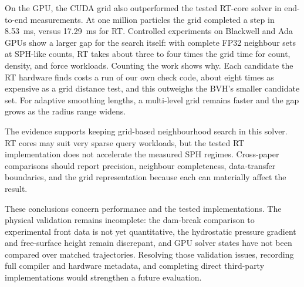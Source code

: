 \documentclass[conference]{IEEEtran}
\begin{document}
On the GPU, the CUDA grid also outperformed the tested RT-core solver in end-to-end measurements. At one million particles the grid completed a step in 8.53~ms, versus 17.29~ms for RT. Controlled experiments on Blackwell and Ada GPUs show a larger gap for the search itself: with complete FP32 neighbour sets at SPH-like counts, RT takes about three to four times the grid time for count, density, and force workloads. Counting the work shows why. Each candidate the RT hardware finds costs a run of our own check code, about eight times as expensive as a grid distance test, and this outweighs the BVH's smaller candidate set. For adaptive smoothing lengths, a multi-level grid remains faster and the gap grows as the radius range widens.

The evidence supports keeping grid-based neighbourhood search in this solver. RT cores may suit very sparse query workloads, but the tested RT implementation does not accelerate the measured SPH regimes. Cross-paper comparisons should report precision, neighbour completeness, data-transfer boundaries, and the grid representation because each can materially affect the result.

These conclusions concern performance and the tested implementations. The physical validation remains incomplete: the dam-break comparison to experimental front data is not yet quantitative, the hydrostatic pressure gradient and free-surface height remain discrepant, and GPU solver states have not been compared over matched trajectories. Resolving those validation issues, recording full compiler and hardware metadata, and completing direct third-party implementations would strengthen a future evaluation.



\end{document}
